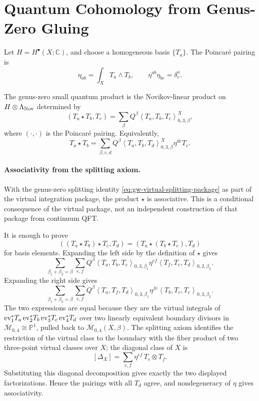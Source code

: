 \section{Quantum Cohomology from Genus-Zero Gluing}

Let \(H=H^\bullet(X;\mathbb C)\), and choose a homogeneous basis
\(\{T_a\}\).  The Poincar\'e pairing is
\[
  \eta_{ab}=\int_X T_a\wedge T_b,
  \qquad
  \eta^{ab}\eta_{bc}=\delta^a_c.
\]

\begin{definition}
The genus-zero small quantum product is the Novikov-linear product on
\(H\otimes \Lambda_{\rm Nov}\) determined by
\[
  (T_a\star T_b,T_c)
  =
  \sum_{\beta} Q^\beta
  \left\langle T_a,T_b,T_c\right\rangle_{0,3,\beta}^{X},
\]
where \((\cdot,\cdot)\) is the Poincar\'e pairing.  Equivalently,
\[
  T_a\star T_b
  =
  \sum_{\beta,c,d}
  Q^\beta
  \left\langle T_a,T_b,T_d\right\rangle_{0,3,\beta}^{X}
  \eta^{dc}T_c .
\]
\end{definition}

\paragraph{Associativity from the splitting axiom.}
With the genus-zero splitting identity
\eqref{eq:gw-virtual-splitting-package} as part of the virtual integration
package, the product \(\star\) is associative.  This is a conditional
consequence of the virtual package, not an independent construction of that
package from continuum QFT.

It is enough to prove
\[
  ((T_a\star T_b)\star T_c,T_d)
  =
  (T_a\star (T_b\star T_c),T_d)
\]
for basis elements.  Expanding the left side by the definition of \(\star\)
gives
\[
  \sum_{\beta_1+\beta_2=\beta}
  \sum_{e,f}
  Q^\beta
  \left\langle T_a,T_b,T_e\right\rangle_{0,3,\beta_1}
  \eta^{ef}
  \left\langle T_f,T_c,T_d\right\rangle_{0,3,\beta_2}.
\]
Expanding the right side gives
\[
  \sum_{\beta_1+\beta_2=\beta}
  \sum_{e,f}
  Q^\beta
  \left\langle T_a,T_f,T_d\right\rangle_{0,3,\beta_1}
  \eta^{fe}
  \left\langle T_b,T_c,T_e\right\rangle_{0,3,\beta_2}.
\]
The two expressions are equal because they are the virtual integrals of
\({\rm ev}_1^\ast T_a\,{\rm ev}_2^\ast T_b\,{\rm ev}_3^\ast T_c\,
{\rm ev}_4^\ast T_d\) over two linearly equivalent boundary divisors in
\(\overline{\mathcal M}_{0,4}\cong \mathbb P^1\), pulled back to
\(\overline{\mathcal M}_{0,4}(X,\beta)\).  The splitting axiom identifies the
restriction of the virtual class to the boundary with the fiber product of two
three-point virtual classes over \(X\); the diagonal class of \(X\) is
\[
  [\Delta_X]=\sum_{e,f}\eta^{ef}\,T_e\otimes T_f .
\]
Substituting this diagonal decomposition gives exactly the two displayed
factorizations.  Hence the pairings with all \(T_d\) agree, and
nondegeneracy of \(\eta\) gives associativity.

